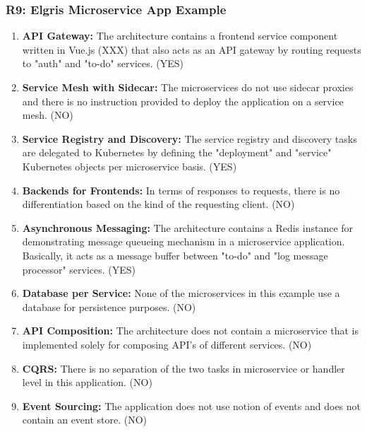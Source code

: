 \documentclass{Configuration_Files/PoliMi3i_thesis}
\begin{document}
\subsubsection{R9: Elgris Microservice App Example}
\label{subsubsec:R9}

\begin{enumerate}
    \item \textbf{API Gateway:} The architecture contains a frontend service component written in Vue.js (XXX) that also acts as an API gateway by routing requests to "auth" and "to-do" services. (YES)
    
    \item \textbf{Service Mesh with Sidecar:} The microservices do not use sidecar proxies and there is no instruction provided to deploy the application on a service mesh. (NO)
    
    \item \textbf{Service Registry and Discovery:} The service registry and discovery tasks are delegated to Kubernetes by defining the "deployment" and "service" Kubernetes objects per microservice basis. (YES)
    
    \item \textbf{Backends for Frontends:} In terms of responses to requests, there is no differentiation based on the kind of the requesting client. (NO)
    
    \item \textbf{Asynchronous Messaging:} The architecture contains a Redis instance for demonstrating message queueing mechanism in a microservice application.
    Basically, it acts as a message buffer between "to-do" and "log message processor" services. (YES)
    
    \item \textbf{Database per Service:} None of the microservices in this example use a database for persistence purposes. (NO)
    
    \item \textbf{API Composition:} The architecture does not contain a microservice that is implemented solely for composing API's of different services. (NO)
    
    \item \textbf{CQRS:} There is no separation of the two tasks in microservice or handler level in this application. (NO)
    
    \item \textbf{Event Sourcing:} The application does not use notion of events and does not contain an event store. (NO)
    

\end{enumerate}
\end{document}
